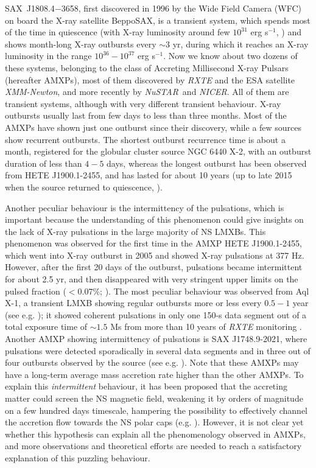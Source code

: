 \documentclass[graybox]{svmult}
\def \xmm {{\em XMM-Newton\xspace}}
\def \rxte {{\em RXTE\xspace}}
\def \saxj{{\rm SAX~J1808.4$-$3658\xspace}}
\def \nustar{{\em NuSTAR\xspace}}
\def \nicer{{\em NICER\xspace}}
\begin{document}
\saxj, first discovered in 1996 by the Wide Field Camera (WFC) on board the X-ray satellite BeppoSAX, is a transient system, which spends most of the time in quiescence (with X-ray luminosity around few $10^{31}$ erg s$^{-1}$, \cite{Campana2004}) and shows month-long X-ray outbursts every $\sim3$ yr, during which it reaches an X-ray luminosity in the range $10^{36}-10^{37}$ erg s$^{-1}$. Now we know about two dozens of these systems, belonging to the class of Accreting Millisecond X-ray Pulsars (hereafter AMXPs), most of them discovered by \rxte{} and the ESA satellite \xmm{}, and more recently by \nustar\ and \nicer{}.
All of them are transient systems, although with very different transient behaviour. X-ray outbursts usually last from few days to less than three months. Most of the AMXPs have shown just one outburst since their discovery, while a few sources show recurrent outbursts. The shortest outburst recurrence time is about a month, registered for the globular cluster source NGC 6440 X-2, with an outburst duration of less than $4-5$ days, whereas the longest outburst has been observed from HETE J1900.1-2455, and has lasted for about 10 years (up to late 2015 when the source returned to quiescence, \cite{Degenaar2017b}).

Another peculiar behaviour is the intermittency of the pulsations, which is important because the understanding of this phenomenon could give insights on the lack of X-ray pulsations in the large majority of NS LMXBs. This phenomenon was observed for the first time in the AMXP HETE J1900.1-2455, which went into X-ray outburst in 2005 and showed X-ray pulsations at 377 Hz. However, after the first 20 days of the outburst, pulsations became intermittent for about 2.5 yr, and then disappeared with very stringent upper limits on the pulsed fraction ($< 0.07\%$; \cite{Patruno2012a}). The most peculiar behaviour was observed from Aql X-1, a transient LMXB showing regular outbursts more or less every $0.5-1$ year (see e.g. \cite{Campana2013}); it showed coherent pulsations in only one 150-s data segment out of a total exposure time of $\sim1.5$ Ms from more than 10 years of \rxte{} monitoring \cite{Casella2008}. Another AMXP showing intermittency of pulsations is SAX J1748.9-2021, where pulsations were detected sporadically in several data segments and in three out of four outbursts observed by the source (see e.g. \cite{Patruno2009}). Note that these AMXPs may have a long-term average mass accretion rate higher than the other AMXPs. To explain this {\it intermittent} behaviour, it has been proposed that the accreting matter could screen the NS magnetic field, weakening it by orders of magnitude on a few hundred days timescale, hampering the possibility to effectively channel the accretion flow towards the NS polar caps (e.g. \cite{Patruno2012a}). However, it is not clear yet whether this hypothesis can explain all the phenomenology observed in AMXPs, and more observations and theoretical efforts are needed to reach a satisfactory explanation of this puzzling behaviour.
\end{document}
